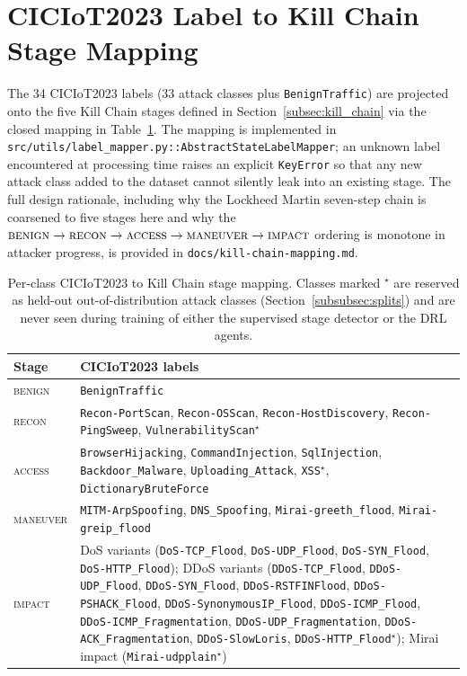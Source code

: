 \section{CICIoT2023 Label to Kill Chain Stage Mapping}\label{app:kc_mapping}

The 34 CICIoT2023 labels (33 attack classes plus \texttt{BenignTraffic}) are projected onto the five Kill Chain stages defined in Section~\ref{subsec:kill_chain} via the closed mapping in Table~\ref{tab:kc_mapping}. The mapping is implemented in \texttt{src/utils/label\_mapper.py::AbstractStateLabelMapper}; an unknown label encountered at processing time raises an explicit \texttt{KeyError} so that any new attack class added to the dataset cannot silently leak into an existing stage. The full design rationale, including why the Lockheed Martin seven-step chain is coarsened to five stages here and why the $\textsc{benign} \to \textsc{recon} \to \textsc{access} \to \textsc{maneuver} \to \textsc{impact}$ ordering is monotone in attacker progress, is provided in \texttt{docs/kill-chain-mapping.md}.

\begin{table}[!htbp]
\centering
\caption{Per-class CICIoT2023 to Kill Chain stage mapping. Classes marked $^\star$ are reserved as held-out out-of-distribution attack classes (Section~\ref{subsubsec:splits}) and are never seen during training of either the supervised stage detector or the DRL agents.}
\label{tab:kc_mapping}
\begin{tabular}{l p{10cm}}
\hline
Stage & CICIoT2023 labels \\
\hline
\textsc{benign}  & \texttt{BenignTraffic} \\
\hline
\textsc{recon}   & \texttt{Recon-PortScan}, \texttt{Recon-OSScan}, \texttt{Recon-HostDiscovery}, \texttt{Recon-PingSweep}, \texttt{VulnerabilityScan}$^\star$ \\
\hline
\textsc{access}  & \texttt{BrowserHijacking}, \texttt{CommandInjection}, \texttt{SqlInjection}, \texttt{Backdoor\_Malware}, \texttt{Uploading\_Attack}, \texttt{XSS}$^\star$, \texttt{DictionaryBruteForce} \\
\hline
\textsc{maneuver} & \texttt{MITM-ArpSpoofing}, \texttt{DNS\_Spoofing}, \texttt{Mirai-greeth\_flood}, \texttt{Mirai-greip\_flood} \\
\hline
\textsc{impact}  & DoS variants (\texttt{DoS-TCP\_Flood}, \texttt{DoS-UDP\_Flood}, \texttt{DoS-SYN\_Flood}, \texttt{DoS-HTTP\_Flood}); DDoS variants (\texttt{DDoS-TCP\_Flood}, \texttt{DDoS-UDP\_Flood}, \texttt{DDoS-SYN\_Flood}, \texttt{DDoS-RSTFINFlood}, \texttt{DDoS-PSHACK\_Flood}, \texttt{DDoS-SynonymousIP\_Flood}, \texttt{DDoS-ICMP\_Flood}, \texttt{DDoS-ICMP\_Fragmentation}, \texttt{DDoS-UDP\_Fragmentation}, \texttt{DDoS-ACK\_Fragmentation}, \texttt{DDoS-SlowLoris}, \texttt{DDoS-HTTP\_Flood}$^\star$); Mirai impact (\texttt{Mirai-udpplain}$^\star$) \\
\hline
\end{tabular}
\end{table}

